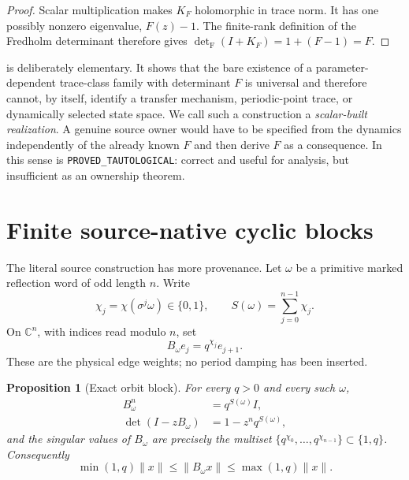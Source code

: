\documentclass[11pt]{article}
\newtheorem{proposition}[theorem]{Proposition}
\newcommand{\Fdet}{\det_{\mathrm F}}
\begin{document}
\begin{proof}
Scalar multiplication makes $K_F$ holomorphic in trace norm.  It has one
possibly nonzero eigenvalue, $F(z)-1$.  The finite-rank definition of the
Fredholm determinant therefore gives
$\Fdet(I+K_F)=1+(F-1)=F$.
\end{proof}

 is deliberately elementary.  It shows that the bare
existence of a parameter-dependent trace-class family with determinant $F$
is universal and therefore cannot, by itself, identify a transfer
mechanism, periodic-point trace, or dynamically selected state space.  We
call such a construction a \emph{scalar-built realization}.  A genuine
source owner would have to be specified from the dynamics independently of
the already known $F$ and then derive $F$ as a consequence.  In this sense
 is \texttt{PROVED\_TAUTOLOGICAL}: correct and useful for
analysis, but insufficient as an ownership theorem.

\section{Finite source-native cyclic blocks}

The literal source construction has more provenance.  Let $\omega$ be a
primitive marked reflection word of odd length $n$.  Write
\[
 \chi_j=\chi(\sigma^j\omega)\in\{0,1\},\qquad
 S(\omega)=\sum_{j=0}^{n-1}\chi_j.
\]
On $\mathbb C^n$, with indices read modulo $n$, set
\begin{equation}\label{eq:block}
 B_\omega e_j=q^{\chi_j}e_{j+1}.
\end{equation}
These are the physical edge weights; no period damping has been inserted.

\begin{proposition}[Exact orbit block]\label{prop:block}
For every $q>0$ and every such $\omega$,
\begin{align}
 B_\omega^n&=q^{S(\omega)}I,\label{eq:turn}\\
 \det(I-zB_\omega)&=1-z^nq^{S(\omega)},\label{eq:block-det}
\end{align}
and the singular values of $B_\omega$ are precisely the multiset
$\{q^{\chi_0},\ldots,q^{\chi_{n-1}}\}\subset\{1,q\}$.
Consequently
\begin{equation}\label{eq:block-bounds}
 \min(1,q)\|x\|\leq\|B_\omega x\|
 \leq\max(1,q)\|x\|.
\end{equation}
\end{proposition}
\end{document}

